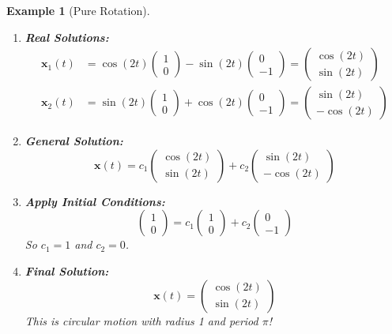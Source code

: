 \documentclass[12pt]{article}
\newtheorem{example}{Example}
\begin{document}
\begin{example}[Pure Rotation]
\begin{enumerate}
\item \textbf{Real Solutions:}
\begin{align}
\mathbf{x}_{1}(t) &= \cos(2t)\begin{pmatrix} 1 \\ 0 \end{pmatrix} - \sin(2t)\begin{pmatrix} 0 \\ -1 \end{pmatrix} = \begin{pmatrix} \cos(2t) \\ \sin(2t) \end{pmatrix} \\
\mathbf{x}_{2}(t) &= \sin(2t)\begin{pmatrix} 1 \\ 0 \end{pmatrix} + \cos(2t)\begin{pmatrix} 0 \\ -1 \end{pmatrix} = \begin{pmatrix} \sin(2t) \\ -\cos(2t) \end{pmatrix}
\end{align}

\item \textbf{General Solution:}
\[\mathbf{x}(t) = c_{1}\begin{pmatrix} \cos(2t) \\ \sin(2t) \end{pmatrix} + c_{2}\begin{pmatrix} \sin(2t) \\ -\cos(2t) \end{pmatrix}\]

\item \textbf{Apply Initial Conditions:}
\[\begin{pmatrix} 1 \\ 0 \end{pmatrix} = c_{1}\begin{pmatrix} 1 \\ 0 \end{pmatrix} + c_{2}\begin{pmatrix} 0 \\ -1 \end{pmatrix}\]
So $c_{1} = 1$ and $c_{2} = 0$.

\item \textbf{Final Solution:}
\[\mathbf{x}(t) = \begin{pmatrix} \cos(2t) \\ \sin(2t) \end{pmatrix}\]
This is circular motion with radius 1 and period $\pi$!
\end{enumerate}
\end{example}
\end{document}
